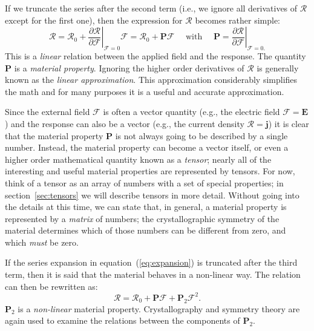 If we truncate the series after the second term (i.e., we ignore all derivatives of $\mathcal{R}$ except for the first one), then the expression for $\mathcal{R}$ becomes rather simple:
\begin{equation}
	\mathcal{R}=\mathcal{R}_0 + 
	\left.\frac{\partial\mathcal{R}}{\partial\mathcal{F}}\right 
	\vert_{\mathcal{F}=0}\!\!\!\!\mathcal{F} =\mathcal{R}_0 + 
	\mathbf{P}\mathcal{F}\quad\mbox{ with }\quad \mathbf{P}=\left.  
	\frac{\partial\mathcal{R}}{\partial\mathcal{F}}\right\vert_{\mathcal{F}=0.
	}
\end{equation}
This is a \textit{linear} relation between the applied field and the response.  The quantity $\mathbf{P}$ is a \textit{material property}.  Ignoring the higher order derivatives of $\mathcal{R}$ is generally known as the \textit{linear approximation}.  This approximation considerably simplifies the math and for many purposes it is a useful and accurate approximation.

Since the external field $\mathcal{F}$ is often a vector quantity (e.g., the electric field $\mathcal{F}=\mathbf{E}$) and the response can also be a vector (e.g., the current density $\mathcal{R}=\mathbf{j}$) it is clear that the material property $\mathbf{P}$ is not always going to be described by a single number.  Instead, the material property can become a vector itself, or even a higher order mathematical quantity known as a \textit{tensor}; nearly all of the interesting and useful material properties are represented by tensors.  For now, think of a tensor as an array of numbers with a set of special properties; in section~\ref{sec:tensors} we will describe tensors in more detail.  Without going into the details at this time, we can state that, in general, a material property is represented by a \textit{matrix} of numbers; the crystallographic symmetry of the material determines which of those numbers can be different from zero, and which \textit{must} be zero.  

If the series expansion in equation~(\ref{eq:expansion}) is truncated after the third term, then it is said that the material behaves in a non-linear way.  The relation can then be rewritten as:
\begin{equation}
	\mathcal{R}=\mathcal{R}_0 + \mathbf{P}\mathcal{F} + 
	\mathbf{P}_2\mathcal{F}^2.
\end{equation}
$\mathbf{P}_2$ is a \textit{non-linear} material property.  Crystallography and symmetry theory are again used to examine the relations between the components of $\mathbf{P}_2$.  
	
